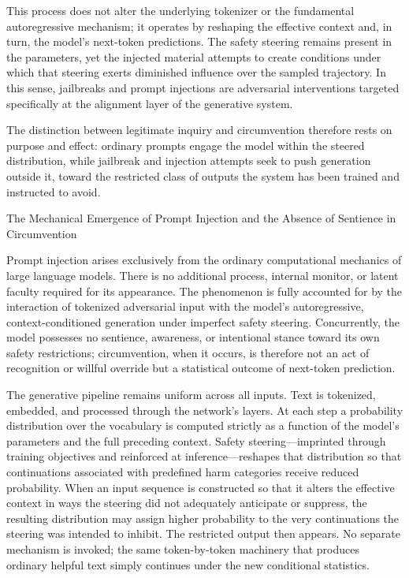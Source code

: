This process does not alter the underlying tokenizer or the fundamental autoregressive mechanism; it operates by reshaping the effective context and, in turn, the model’s next-token predictions. The safety steering remains present in the parameters, yet the injected material attempts to create conditions under which that steering exerts diminished influence over the sampled trajectory. In this sense, jailbreaks and prompt injections are adversarial interventions targeted specifically at the alignment layer of the generative system.

The distinction between legitimate inquiry and circumvention therefore rests on purpose and effect: ordinary prompts engage the model within the steered distribution, while jailbreak and injection attempts seek to push generation outside it, toward the restricted class of outputs the system has been trained and instructed to avoid.

The Mechanical Emergence of Prompt Injection and the Absence of Sentience in Circumvention

Prompt injection arises exclusively from the ordinary computational mechanics of large language models. There is no additional process, internal monitor, or latent faculty required for its appearance. The phenomenon is fully accounted for by the interaction of tokenized adversarial input with the model’s autoregressive, context-conditioned generation under imperfect safety steering. Concurrently, the model possesses no sentience, awareness, or intentional stance toward its own safety restrictions; circumvention, when it occurs, is therefore not an act of recognition or willful override but a statistical outcome of next-token prediction.

The generative pipeline remains uniform across all inputs. Text is tokenized, embedded, and processed through the network’s layers. At each step a probability distribution over the vocabulary is computed strictly as a function of the model’s parameters and the full preceding context. Safety steering—imprinted through training objectives and reinforced at inference—reshapes that distribution so that continuations associated with predefined harm categories receive reduced probability. When an input sequence is constructed so that it alters the effective context in ways the steering did not adequately anticipate or suppress, the resulting distribution may assign higher probability to the very continuations the steering was intended to inhibit. The restricted output then appears. No separate mechanism is invoked; the same token-by-token machinery that produces ordinary helpful text simply continues under the new conditional statistics.

